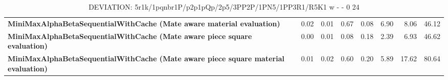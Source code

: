\begin{table}[H]
{\begin{tabular}{|p{8cm}|*{7}{r|}}
            \rowcolor[HTML]{EFEFEF}
            \textbf{MiniMaxAlphaBetaSequentialWithCache (Mate aware material evaluation)}               & 0.02 & 0.01 & 0.67 & 0.08 & 6.90 & 8.06 & 46.12 \\
            \rowcolor[HTML]{FFFFFF}
            \textbf{MiniMaxAlphaBetaSequentialWithCache (Mate aware piece square evaluation)}               & 0.00 & 0.01 & 0.08 & 0.18 & 2.39 & 6.93 & 46.62 \\
            \rowcolor[HTML]{EFEFEF}
            \textbf{MiniMaxAlphaBetaSequentialWithCache (Mate aware piece square material evaluation)}               & 0.01 & 0.02 & 0.60 & 0.20 & 5.89 & 17.62 & 80.64 \\

            \hline
        \end{tabular}%
    }
    \caption{DEVIATION: 5r1k/1pqnbr1P/p2p1pQp/2p5/3PP2P/1PN5/1PP3R1/R5K1 w - - 0 24}
    \label{tab:mid-game---promotion---mate-in-2---short-deviation}
\end{table}
